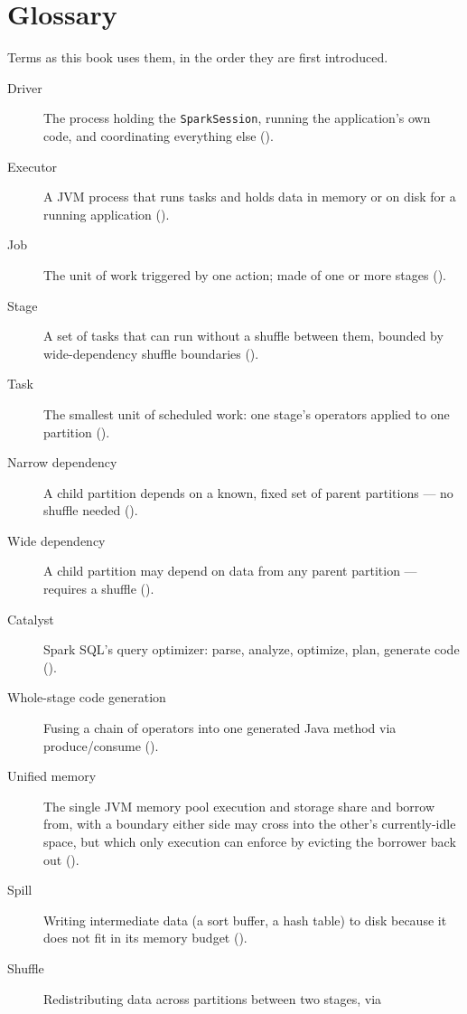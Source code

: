 \chapter{Glossary}
\label{app:glossary}

Terms as this book uses them, in the order they are first introduced.

\begin{description}
\item[Driver] The process holding the \texttt{SparkSession}, running the
      application's own code, and coordinating everything else
      ().
\item[Executor] A JVM process that runs tasks and holds data in memory or on
      disk for a running application ().
\item[Job] The unit of work triggered by one action; made of one or more
      stages ().
\item[Stage] A set of tasks that can run without a shuffle between them,
      bounded by wide-dependency shuffle boundaries ().
\item[Task] The smallest unit of scheduled work: one stage's operators
      applied to one partition ().
\item[Narrow dependency] A child partition depends on a known, fixed set of
      parent partitions --- no shuffle needed ().
\item[Wide dependency] A child partition may depend on data from any parent
      partition --- requires a shuffle ().
\item[Catalyst] Spark SQL's query optimizer: parse, analyze, optimize,
      plan, generate code ().
\item[Whole-stage code generation] Fusing a chain of operators into one
      generated Java method via produce/consume
      ().
\item[Unified memory] The single JVM memory pool execution and storage
      share and borrow from, with a boundary either side may cross into the
      other's currently-idle space, but which only execution can enforce
      by evicting the borrower back out ().
\item[Spill] Writing intermediate data (a sort buffer, a hash table) to disk
      because it does not fit in its memory budget ().
\item[Shuffle] Redistributing data across partitions between two stages, via

\end{description}
